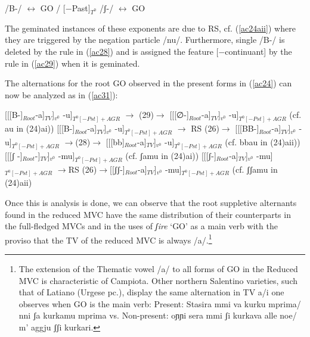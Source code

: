 \documentclass[output=paper]{langscibook}
\begin{document}
\ea\label{ac30}
    \ea \label{ac30a}/B-/ $\longleftrightarrow$ GO / \underline{\hspace{2em}}  [−Past]$_{T^0}$
    \ex\label{ac30b} /ʃ-/ $\longleftrightarrow$ GO
    \z
\z

The geminated instances of these exponents are due to RS, cf. (\ref{ac24aii}) where they are triggered by the negation particle /nu/. Furthermore, single /B-/ is deleted by the rule in (\ref{ac28}) and is assigned the feature [−continuant] by the rule in (\ref{ac29}) when it is geminated.

The alternations for the root GO observed in the present forms in (\ref{ac24}) can now be analyzed as in (\ref{ac31}):

\ea\label{ac31}
    \ea \label{ac31a}{[[[B-]}$_{Root}$-a]$_{TV}$]$_{v^0}$ -u]$_{T^0 [−Pst]+AGR}$ $\rightarrow$ (29)$\rightarrow$ [[[∅-]$_{Root}$-a]$_{TV}$]$_{v^0}$ -u]$_{T^0 [-Pst]+AGR}$        (cf. au in (24)ai))
    \ex \label{ac31b}{[[[B-]}$_{Root}$-a]$_{TV}$]$_{v^0}$ -u]$_{T^0 [−Pst]+AGR}$ $\rightarrow$ RS (26)$\rightarrow$ [[[BB-]$_{Root}$-a]$_{TV}$]$_{v^0}$ -u]$_{T^0 [-Pst]+AGR}$      $\rightarrow$(28)$\rightarrow$ [[[bb]$_{Root}$-a]$_{TV}$]$_{v^0}$ -u]$_{T^0 [-Pst]+AGR}$   (cf. bbau in (24)aii)) 
    \ex \label{ac31c}{[[[ʃ -]}$_{Root}$-]$_{TV}$]$_{v^0}$ -mu]$_{T^0 [-Pst]+AGR}$ (cf. ʃamu in (24)ai))
    \ex \label{ac31d}{[[[ʃ-]}$_{Root}$-a]$_{TV}$]$_{v^0}$ -mu]$_{T^0 [-Pst]+AGR}$ $\rightarrow$RS (26)$\rightarrow$[[ʃʃ-]$_{Root}$-a]$_{TV}$]$_{v^0}$ -mu]$_{T^0 [-Pst]+AGR}$           (cf. ʃʃamu in (24)aii)
    \z
\z

Once this is analysis is done, we can observe that the root suppletive alternants found in the reduced MVC have the same distribution of their counterparts in the full-fledged MVCs and in the uses of \textit{ʃire} ‘GO’ as a main verb with the proviso that the TV of the reduced MVC is always /a/.\footnote{The extension of the Thematic vowel /a/ to all forms of GO in the Reduced MVC is characteristic of Campiota.  Other northern  Salentino varieties, such that of Latiano (Urgese pc.), display the same alternation in TV a/i one observes when GO is the main verb: Present: Stasira mmi va kurku mprima/ nni ʃa kurkamu mprima vs. Non-present: oɲɲi sera mmi ʃi kurkava alle noe/ m’ aggju ʃʃi kurkari.}
\end{document}
